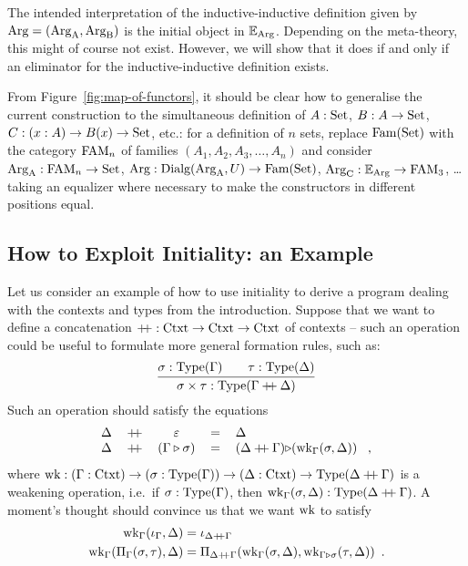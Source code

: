 \documentclass[orivec,envcountsame, ,envcountsect]{llncs}
\begin{document}
\begin{remark}
  The intended interpretation of the inductive-inductive definition
  given by $\text{Arg} = (\text{Arg}_{\text{A}}, \text{Arg}_{\text{B}})$ is the initial object in
  $\mathbb{E}_{\text{Arg}}$. Depending on the meta-theory, this might of
  course not exist. However, we will show that it does if and only if
  an eliminator for the inductive-inductive definition exists.
\end{remark}

\begin{remark} %
  From Figure~\ref{fig:map-of-functors}, it should be clear how to
  generalise the current construction to the simultaneous definition
  of $A : \text{Set}$, $B : A \to \text{Set}$, $C : {(x : A)} \to B(x) \to \text{Set}$,
  etc.: for a definition of $n$ sets, replace $\text{Fam}(\text{Set})$ with the category $\text{FAM}_n$ of families $(A_1, A_2, A_3, \ldots, A_n)$ and
  consider $\text{Arg}_{\text{A}} : \text{FAM}_n \to \text{Set}$, $\text{Arg} : \text{Dialg}(\text{Arg}_{\text{A}}, U) \to
  \text{Fam}(\text{Set})$, $\text{Arg}_{\text{C}} : \mathbb{E}_{\text{Arg}} \to \text{FAM}_3$, \ldots taking an
  equalizer where necessary to make the constructors in different
  positions equal.
\end{remark}

\subsection{How to Exploit Initiality: an Example}
\label{sec:exploit-init}

Let us consider an example of how to use initiality to
derive a program dealing with the contexts and types from the introduction.
Suppose that we want to define a concatenation $\mathbin{+\mkern-6mu+} : \text{Ctxt}
\to \text{Ctxt} \to \text{Ctxt}$ of contexts -- such an operation could be useful
to formulate more general
formation rules, such as:
\[
\infer{\sigma \times \tau : \Type(\Gamma \concatCtxt \Delta)}{\sigma : \Type(\Gamma) \quad & \tau : \Type(\Delta)}
\]
Such an operation should satisfy the equations
\[
\begin{tabular}{lcccl}
  $\Delta$ & $\concatCtxt$ & $\emptyCtxt$ & $=$ & $\Delta$ \\
  $\Delta$ & $\concatCtxt$ & $(\consCtxt{\Gamma}{\sigma})$ & $=$ & $\consCtxt{(\Delta \concatCtxt \Gamma)}{$(\wkapp{\Gamma}{\Delta}{\sigma})$}$ \enspace ,
\end{tabular}
\]
where $\text{wk} : (\Gamma : \text{Ctxt}) \to (\sigma : \text{Type}(\Gamma)) \to (\Delta
: \text{Ctxt}) \to \text{Type}(\Delta \mathbin{+\mkern-6mu+} \Gamma)$ is a weakening
operation, i.e.\ if $\sigma : \text{Type}(\Gamma)$, then
$\text{wk}_{\Gamma}(\sigma, \Delta) : \text{Type}(\Delta \mathbin{+\mkern-6mu+} \Gamma)$. A
moment's thought should convince us that we want $\text{wk}$ to satisfy
\begin{align*}
  \text{wk}_{\Gamma}(\iota_{\Gamma}, \Delta) &= \iota_{\Delta \mathbin{+\mkern-6mu+} \Gamma} \\
  \text{wk}_{\Gamma}(\Pi_{\Gamma}(\sigma, \tau), \Delta) &= \Pi_{\Delta \mathbin{+\mkern-6mu+} \Gamma}(\text{wk}_{\Gamma}(\sigma, \Delta), \text{wk}_{\Gamma \triangleright \sigma}(\tau, \Delta)) \enspace .
\end{align*}
\end{document}
